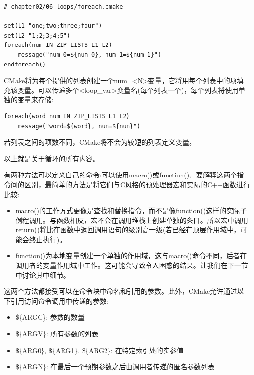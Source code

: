 \begin{lstlisting}[style=styleCMake]
# chapter02/06-loops/foreach.cmake

set(L1 "one;two;three;four")
set(L2 "1;2;3;4;5")
foreach(num IN ZIP_LISTS L1 L2)
	message("num_0=${num_0}, num_1=${num_1}")
endforeach()
\end{lstlisting}

CMake将为每个提供的列表创建一个num\_<N>变量，它将用每个列表中的项填充该变量。可以传递多个<loop\_var>变量名(每个列表一个)，每个列表将使用单独的变量来存储:

\begin{lstlisting}[style=styleCMake]
foreach(word num IN ZIP_LISTS L1 L2)
	message("word=${word}, num=${num}")
\end{lstlisting}

若列表之间的项数不同，CMake将不会为较短的列表定义变量。

以上就是关于循环的所有内容。


有两种方法可以定义自己的命令:可以使用macro()或function()。要解释这两个指令间的区别，最简单的方法是将它们与C风格的预处理器宏和实际的C++函数进行比较:

\begin{itemize}
\item 
macro()的工作方式更像是查找和替换指令，而不是像function()这样的实际子例程调用。与函数相反，宏不会在调用堆栈上创建单独的条目。所以宏中调用return()将比在函数中返回调用语句的级别高一级(若已经在顶层作用域中，可能会终止执行)。

\item 
function()为本地变量创建一个单独的作用域，这与macro()命令不同，后者在调用者的变量作用域中工作。这可能会导致令人困惑的结果。让我们在下一节中讨论其中细节。
\end{itemize}

这两个方法都接受可以在命令块中命名和引用的参数。此外，CMake允许通过以下引用访问命令调用中传递的参数:

\begin{itemize}
\item 
\$\{ARGC\}: 参数的数量

\item 
\$\{ARGV\}: 所有参数的列表

\item 
\$\{ARG0\}, \$\{ARG1\}, \$\{ARG2\}: 在特定索引处的实参值

\item 
\$\{ARGN\}: 在最后一个预期参数之后由调用者传递的匿名参数列表
\end{itemize}


